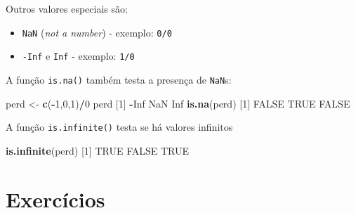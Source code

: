 \documentclass[10pt,a4paper]{book}
\newenvironment{Shaded}{\begin{snugshade}}{\end{snugshade}}
\newcommand{\KeywordTok}[1]{\textcolor[rgb]{0.13,0.29,0.53}{\textbf{#1}}}
\newcommand{\DecValTok}[1]{\textcolor[rgb]{0.00,0.00,0.81}{#1}}
\newcommand{\StringTok}[1]{\textcolor[rgb]{0.31,0.60,0.02}{#1}}
\newcommand{\OtherTok}[1]{\textcolor[rgb]{0.56,0.35,0.01}{#1}}
\newcommand{\OperatorTok}[1]{\textcolor[rgb]{0.81,0.36,0.00}{\textbf{#1}}}
\newcommand{\NormalTok}[1]{#1}
\providecommand{\tightlist}{%
  \setlength{\itemsep}{0pt}\setlength{\parskip}{0pt}}
\begin{document}
Outros valores especiais são:

\begin{itemize}
\tightlist
\item
  \texttt{NaN} (\emph{not a number}) - exemplo: \texttt{0/0}
\item
  \texttt{-Inf} e \texttt{Inf} - exemplo: \texttt{1/0}
\end{itemize}

A função \texttt{is.na()} também testa a presença de \texttt{NaN}s:

\begin{Shaded}
\begin{Highlighting}[]
\NormalTok{perd <-}\StringTok{ }\KeywordTok{c}\NormalTok{(}\OperatorTok{-}\DecValTok{1}\NormalTok{,}\DecValTok{0}\NormalTok{,}\DecValTok{1}\NormalTok{)}\OperatorTok{/}\DecValTok{0}
\NormalTok{perd}
\NormalTok{[}\DecValTok{1}\NormalTok{] }\OperatorTok{-}\OtherTok{Inf}  \OtherTok{NaN}  \OtherTok{Inf}
\KeywordTok{is.na}\NormalTok{(perd)}
\NormalTok{[}\DecValTok{1}\NormalTok{] }\OtherTok{FALSE}  \OtherTok{TRUE} \OtherTok{FALSE}
\end{Highlighting}
\end{Shaded}

A função \texttt{is.infinite()} testa se há valores infinitos

\begin{Shaded}
\begin{Highlighting}[]
\KeywordTok{is.infinite}\NormalTok{(perd)}
\NormalTok{[}\DecValTok{1}\NormalTok{]  }\OtherTok{TRUE} \OtherTok{FALSE}  \OtherTok{TRUE}
\end{Highlighting}
\end{Shaded}

\section*{Exercícios}\label{exercuxedcios-3}
\end{document}
